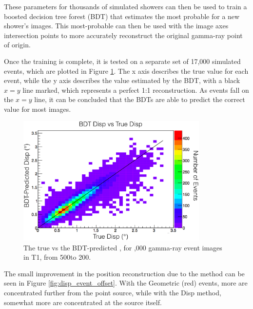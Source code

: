     These parameters for thousands of simulated showers can then be used to train a boosted decision tree forest (BDT) that estimates the most probable \disp{} for a new shower's images.
    This most-probable \disp{} can then be used with the image axes intersection points to more accurately reconstruct the original gamma-ray point of origin.
    
    Once the training is complete, it is tested on a separate set of 17,000 simulated events, which are plotted in Figure \ref{fig:disptraining}.
    The x axis describes the true \disp{} value for each event, while the y axis describes the \disp{} value estimated by the BDT, with a black $x=y$ line marked, which represents a perfect 1:1 \disp{} reconstruction.
    As events fall on the $x=y$ line, it can be concluded that the BDTs are able to predict the correct \disp{} value for most images.

    \begin{figure}[ht]
      \centering
      \includegraphics[width=0.85\textwidth]{images/disp_training.eps}
      \caption[Disp BDT Training]{
        The true \disp{} vs the BDT-predicted \disp{}, for ,000 gamma-ray event images in T1, from 500\GeV to 200\TeV.
      }
      \label{fig:disptraining}
    \end{figure}

    The small improvement in the position reconstruction due to the \disp{} method can be seen in Figure \ref{fig:disp_event_offset}.
    With the Geometric (red) events, more are concentrated further from the point source, while with the Disp method, somewhat more are concentrated at the source itself.


